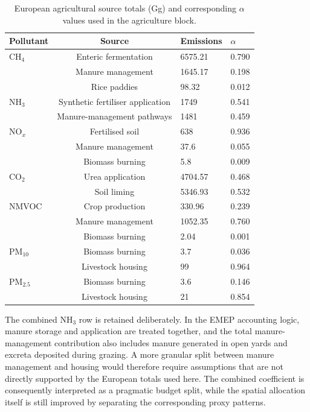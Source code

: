 \begin{table}[htbp]
  \centering
  \caption{European agricultural source totals (Gg) and corresponding
  $\alpha$ values used in the agriculture block.}
  \label{tab:alpha_agriculture}
  \begin{tabular}{lcll}
    \hline
    Pollutant & Source & Emissions & $\alpha$ \\
    \hline
    CH$_4$ & Enteric fermentation & 6575.21 & 0.790 \\
     & Manure management & 1645.17 & 0.198 \\
     & Rice paddies & 98.32 & 0.012 \\
    \hline
    NH$_3$ & Synthetic fertiliser application & 1749 & 0.541 \\
     & Manure-management pathways & 1481 & 0.459 \\
    \hline
    NO$_x$ & Fertilised soil & 638 & 0.936 \\
     & Manure management & 37.6 & 0.055 \\
     & Biomass burning & 5.8 & 0.009 \\
    \hline
    CO$_2$ & Urea application & 4704.57 & 0.468 \\
     & Soil liming & 5346.93 & 0.532 \\
    \hline
    NMVOC & Crop production & 330.96 & 0.239 \\
     & Manure management & 1052.35 & 0.760 \\
     & Biomass burning & 2.04 & 0.001 \\
    \hline
    PM$_{10}$ & Biomass burning & 3.7 & 0.036 \\
     & Livestock housing & 99 & 0.964 \\
    \hline
    PM$_{2.5}$ & Biomass burning & 3.6 & 0.146 \\
     & Livestock housing & 21 & 0.854 \\
    \hline
  \end{tabular}
\end{table}

The combined NH$_3$ row is retained deliberately. In the EMEP
accounting logic, manure storage and application are treated together,
and the total manure-management contribution also includes manure
generated in open yards and excreta deposited during grazing. A more
granular split between manure management and housing would therefore
require assumptions that are not directly supported by the European
totals used here. The combined coefficient is consequently interpreted
as a pragmatic budget split, while the spatial allocation itself is
still improved by separating the corresponding proxy patterns.

